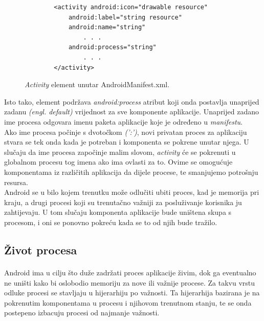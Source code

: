 \documentclass[times, utf8, zavrsni]{fer}
\begin{document}
\begin{figure}[ht!]
\centering
\begingroup
    \fontsize{10pt}{12pt}\selectfont
		\begin{verbatim}
        <activity android:icon="drawable resource"
            android:label="string resource"
            android:name="string"
          	    . . .
            android:process="string"
          	    . . .
        </activity>
		\end{verbatim}
\endgroup
\caption{\textit{Activity} element unutar AndroidManifest.xml.}
\label{overflow}
\end{figure}

Isto tako, \verb|| element podržava \textit{android:process} atribut koji onda postavlja unaprijed zadanu \textit{(engl. default)} vrijednost za sve komponente aplikacije. Unaprijed zadano ime procesa odgovara imenu paketa aplikacije koje je određeno u \textit{manifestu}.\\

Ako ime procesa počinje s dvotočkom \textit{(':')}, novi privatan proces za aplikaciju stvara se tek onda kada je potreban i komponenta se pokrene unutar njega. U slučaju da ime procesa započinje malim slovom, \textit{activity} će se pokrenuti u globalnom procesu tog imena ako ima ovlasti za to. Ovime se omogućuje komponentama iz različitih aplikacija da dijele procese, te smanjujemo potrošnju resursa.\\

Android se u bilo kojem trenutku može odlučiti ubiti proces, kad je memorija pri kraju, a drugi procesi koji su trenutačno važniji za posluživanje korisnika ju zahtijevaju. U tom slučaju komponenta aplikacije bude uništena skupa s procesom, i oni se ponovno pokreću kada se to od njih bude tražilo.


\subsection{Život procesa}
\paragraph{}
Android ima u cilju što duže zadržati proces aplikacije živim, dok ga eventualno ne uništi kako bi oslobodio memoriju za nove ili važnije procese. Za takvu vrstu odluke procesi se stavljaju u hijerarhiju po važnosti. Ta hijerarhija bazirana je na pokrenutim komponentama u procesu i njihovom trenutnom stanju, te se onda postepeno izbacuju procesi od najmanje važnosti.\\
\end{document}

